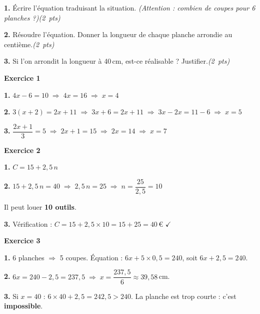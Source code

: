 \documentclass[a4paper,11pt]{article}
\newcommand{\pts}[1]{\hfill\textit{(#1~pts)}}
\newcommand{\reponse}{\par\noindent\dotfill\par}
\newcommand{\reponselong}{%
  \par\noindent\dotfill\par\noindent\dotfill\par}
\begin{document}
\medskip

\textbf{1.}  Écrire l'équation traduisant la situation. \textit{(Attention : combien de coupes pour 6 planches ?)}\pts{2}

\reponse

\vspace{4pt}

\textbf{2.}  Résoudre l'équation. Donner la longueur de chaque planche arrondie au centième.\pts{2}

\reponselong

\vspace{4pt}

\textbf{3.}  Si l'on arrondit la longueur à 40\,cm, est-ce réalisable ? Justifier.\pts{2}

\reponselong

\vspace{12pt}
\begin{correction}
\textbf{Exercice 1}

\textbf{1.} $4x - 6 = 10 \;\Longrightarrow\; 4x = 16 \;\Longrightarrow\; x = 4$

\textbf{2.} $3(x + 2) = 2x + 11 \;\Longrightarrow\; 3x + 6 = 2x + 11
  \;\Longrightarrow\; 3x - 2x = 11 - 6 \;\Longrightarrow\; x = 5$

\textbf{3.} $\dfrac{2x + 1}{3} = 5 \;\Longrightarrow\; 2x + 1 = 15
  \;\Longrightarrow\; 2x = 14 \;\Longrightarrow\; x = 7$

\bigskip
\textbf{Exercice 2}

\textbf{1.} $C = 15 + 2{,}5\,n$

\textbf{2.} $15 + 2{,}5\,n = 40 \;\Longrightarrow\; 2{,}5\,n = 25
  \;\Longrightarrow\; n = \dfrac{25}{2{,}5} = 10$

Il peut louer \textbf{10 outils}.

\textbf{3.} Vérification : $C = 15 + 2{,}5 \times 10 = 15 + 25 = 40$\,\euro{} \quad $\checkmark$

\bigskip
\textbf{Exercice 3}

\textbf{1.} 6 planches $\Rightarrow$ 5 coupes. Équation : $6x + 5 \times 0{,}5 = 240$, soit $6x + 2{,}5 = 240$.

\textbf{2.} $6x = 240 - 2{,}5 = 237{,}5 \;\Longrightarrow\; x = \dfrac{237{,}5}{6} \approx 39{,}58$\,cm.

\textbf{3.} Si $x = 40$ : $6 \times 40 + 2{,}5 = 242{,}5 > 240$. La planche est trop courte : c'est \textbf{impossible}.
\end{correction}
\end{document}
